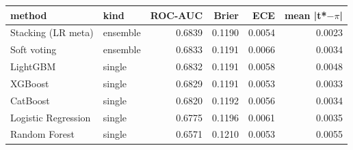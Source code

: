 \begin{tabular}{llrrrr}
\toprule
method & kind & ROC-AUC & Brier & ECE & mean |t*$-$$\pi$| \\
\midrule
Stacking (LR meta) & ensemble & 0.6839 & 0.1190 & 0.0054 & 0.0023 \\
Soft voting & ensemble & 0.6833 & 0.1191 & 0.0066 & 0.0034 \\
LightGBM & single & 0.6832 & 0.1191 & 0.0058 & 0.0048 \\
XGBoost & single & 0.6829 & 0.1191 & 0.0053 & 0.0033 \\
CatBoost & single & 0.6820 & 0.1192 & 0.0056 & 0.0034 \\
Logistic Regression & single & 0.6775 & 0.1196 & 0.0061 & 0.0035 \\
Random Forest & single & 0.6571 & 0.1210 & 0.0053 & 0.0055 \\
\bottomrule
\end{tabular}
